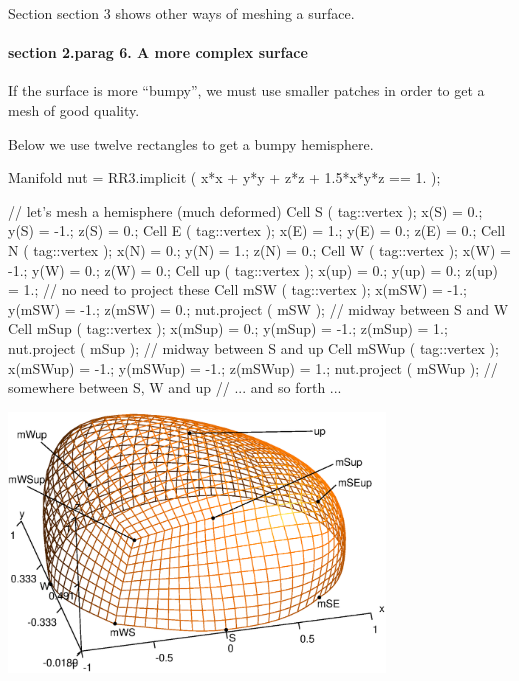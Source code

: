 Section \numb section 3 shows other ways of meshing a surface.


\paragraph{\numb section 2.\numb parag 6. A more complex surface}

If the surface is more ``bumpy'',
we must use smaller patches in order to get a mesh of good quality.

Below we use twelve rectangles to get a bumpy hemisphere.

\verbatim
   Manifold nut = RR3.implicit ( x*x + y*y + z*z + 1.5*x*y*z == 1. );

   // let's mesh a hemisphere (much deformed)
   Cell S ( tag::vertex );    x(S)  =   0.;   y(S)  =  -1.;   z(S)  =  0.;
   Cell E ( tag::vertex );    x(E)  =   1.;   y(E)  =   0.;   z(E)  =  0.;
   Cell N ( tag::vertex );    x(N)  =   0.;   y(N)  =   1.;   z(N)  =  0.;
   Cell W ( tag::vertex );    x(W)  =  -1.;   y(W)  =   0.;   z(W)  =  0.;
   Cell up ( tag::vertex );   x(up) =   0.;   y(up) =   0.;   z(up) =  1.;
   // no need to project these
   Cell mSW ( tag::vertex );  x(mSW) = -1.;   y(mSW) = -1.;   z(mSW) = 0.;
   nut.project ( mSW );  // midway between S and W
   Cell mSup  ( tag::vertex );  x(mSup) =  0.;   y(mSup) = -1.;   z(mSup) = 1.;
   nut.project ( mSup );  // midway between S and up
   Cell mSWup ( tag::vertex );  x(mSWup) = -1.;  y(mSWup) = -1.;  z(mSWup) = 1.;
   nut.project ( mSWup );  // somewhere between S, W and up
   // ... and so forth ...
\endverbatim
	
{ 
\centerline{\includegraphics[width=10cm]{hemisphere-2.eps}} }

